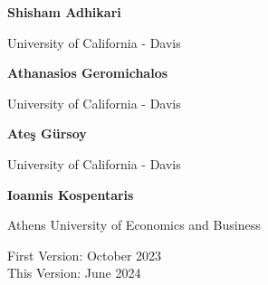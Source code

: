 \documentclass[12pt]{article} %
\theoremstyle{definition}
\begin{document}



\vspace{0.5cm}

\noindent \normalsize  \textbf{Shisham Adhikari}

\noindent University of California - Davis

\vspace{0.4cm}

\noindent \normalsize  \textbf{Athanasios Geromichalos}

\noindent University of California - Davis

\vspace{0.4cm}

\noindent  \textbf{Ate\c{s} G\"ursoy}

\noindent University of California - Davis


\vspace{0.4cm}

\noindent  \textbf{Ioannis Kospentaris}

\noindent Athens University of Economics and Business


\vspace{0.5cm}
\noindent First Version: October 2023 \\
\noindent This Version: June 2024





\vspace{0.7cm}




\normalsize
\end{document}
